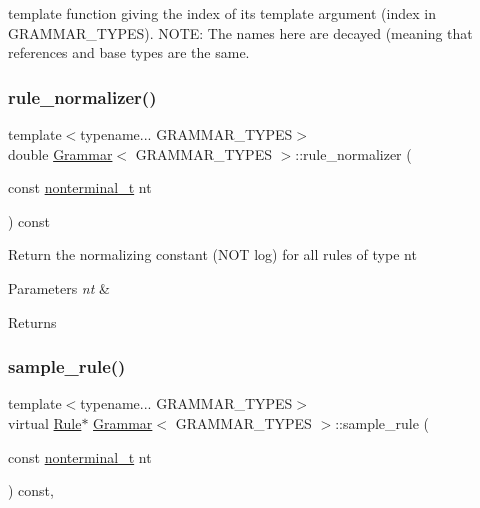 template function giving the index of its template argument (index in G\+R\+A\+M\+M\+A\+R\+\_\+\+T\+Y\+P\+ES). N\+O\+TE\+: The names here are decayed (meaning that references and base types are the same.\mbox{\label{class_grammar_a240019987945a694e26bebcebcf463fc}} 
\subsubsection{\texorpdfstring{rule\+\_\+normalizer()}{rule\_normalizer()}}
{\footnotesize\ttfamily template$<$typename... G\+R\+A\+M\+M\+A\+R\+\_\+\+T\+Y\+P\+ES$>$ \\
double \hyperlink{class_grammar}{Grammar}$<$ G\+R\+A\+M\+M\+A\+R\+\_\+\+T\+Y\+P\+ES $>$\+::rule\+\_\+normalizer (\begin{DoxyParamCaption}\item[{const \hyperlink{_nonterminal_8h_a5c1f658dc7560600a16d22408bd716ca}{nonterminal\+\_\+t}}]{nt }\end{DoxyParamCaption}) const\hspace{0.3cm}{\ttfamily [inline]}}

Return the normalizing constant (N\+OT log) for all rules of type nt 
\begin{DoxyParams}{Parameters}
{\em nt} & \\
\hline
\end{DoxyParams}
\begin{DoxyReturn}{Returns}

\end{DoxyReturn}
\mbox{\label{class_grammar_aba4d092714b8420d8c0a1be63e8566b6}} 
\subsubsection{\texorpdfstring{sample\+\_\+rule()}{sample\_rule()}}
{\footnotesize\ttfamily template$<$typename... G\+R\+A\+M\+M\+A\+R\+\_\+\+T\+Y\+P\+ES$>$ \\
virtual \hyperlink{class_rule}{Rule}$\ast$ \hyperlink{class_grammar}{Grammar}$<$ G\+R\+A\+M\+M\+A\+R\+\_\+\+T\+Y\+P\+ES $>$\+::sample\+\_\+rule (\begin{DoxyParamCaption}\item[{const \hyperlink{_nonterminal_8h_a5c1f658dc7560600a16d22408bd716ca}{nonterminal\+\_\+t}}]{nt }\end{DoxyParamCaption}) const\hspace{0.3cm}{\ttfamily [inline]}, {\ttfamily [virtual]}}

